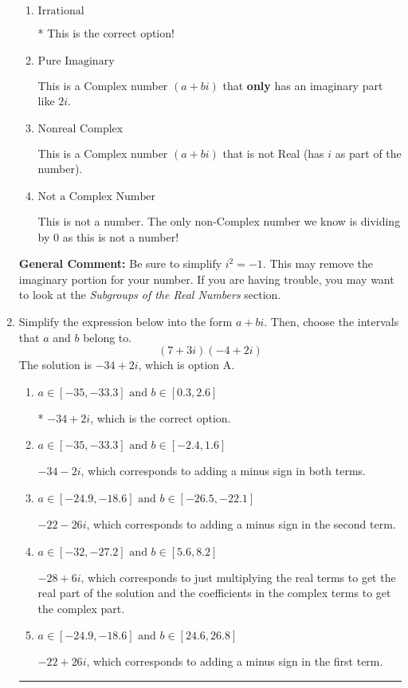 \documentclass{extbook}[14pt]
\newcommand{\litem}[1]{\item #1

\rule{\textwidth}{0.4pt}}
\begin{document}
\begin{enumerate}
{\begin{enumerate}[label=\Alph*.]
These are numbers that can be written as fraction of Integers (e.g., -2/3 + 5)
\item \( \text{Irrational} \)

* This is the correct option!
\item \( \text{Pure Imaginary} \)

This is a Complex number $(a+bi)$ that \textbf{only} has an imaginary part like $2i$.
\item \( \text{Nonreal Complex} \)

This is a Complex number $(a+bi)$ that is not Real (has $i$ as part of the number).
\item \( \text{Not a Complex Number} \)

This is not a number. The only non-Complex number we know is dividing by 0 as this is not a number!
\end{enumerate}

\textbf{General Comment:} Be sure to simplify $i^2 = -1$. This may remove the imaginary portion for your number. If you are having trouble, you may want to look at the \textit{Subgroups of the Real Numbers} section.
}
\litem{
Simplify the expression below into the form $a+bi$. Then, choose the intervals that $a$ and $b$ belong to.
\[ (7 + 3 i)(-4 + 2 i) \]The solution is \( -34 + 2 i \), which is option A.\begin{enumerate}[label=\Alph*.]
\item \( a \in [-35, -33.3] \text{ and } b \in [0.3, 2.6] \)

* $-34 + 2 i$, which is the correct option.
\item \( a \in [-35, -33.3] \text{ and } b \in [-2.4, 1.6] \)

 $-34 - 2 i$, which corresponds to adding a minus sign in both terms.
\item \( a \in [-24.9, -18.6] \text{ and } b \in [-26.5, -22.1] \)

 $-22 - 26 i$, which corresponds to adding a minus sign in the second term.
\item \( a \in [-32, -27.2] \text{ and } b \in [5.6, 8.2] \)

 $-28 + 6 i$, which corresponds to just multiplying the real terms to get the real part of the solution and the coefficients in the complex terms to get the complex part.
\item \( a \in [-24.9, -18.6] \text{ and } b \in [24.6, 26.8] \)

 $-22 + 26 i$, which corresponds to adding a minus sign in the first term.
\end{enumerate}

}
\end{enumerate}
\end{document}
